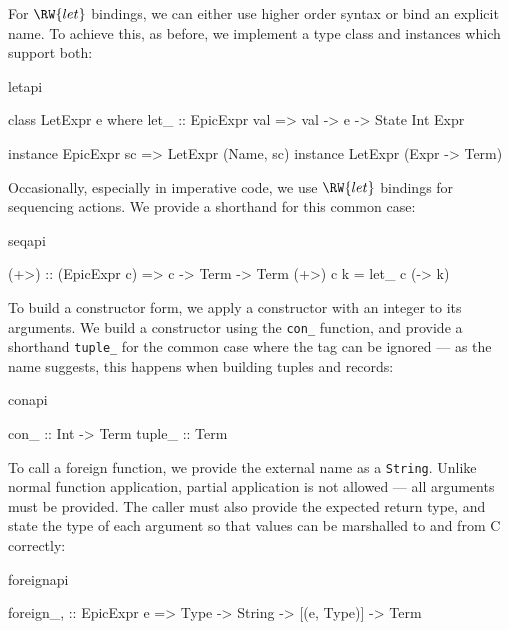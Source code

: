 For $\RW{let}$ bindings, we can either use higher order syntax or bind
an explicit name. To achieve this, as before, we implement a type
class and instances which support both:

\begin{SaveVerbatim}{letapi}

class LetExpr e where
    let_ :: EpicExpr val => val -> e -> State Int Expr

instance EpicExpr sc => LetExpr (Name, sc)
instance                LetExpr (Expr -> Term)

\end{SaveVerbatim}

Occasionally, especially in imperative code, we use $\RW{let}$
bindings for sequencing actions. We provide a shorthand for this
common case:

\begin{SaveVerbatim}{seqapi}

(+>) :: (EpicExpr c) => c -> Term -> Term
(+>) c k = let_ c (\x -> k)

\end{SaveVerbatim}

To build a constructor form, we apply a constructor with an integer
 to its arguments. We build a constructor using the
\texttt{con\_} function, and provide a shorthand \texttt{tuple\_} for
the common case where the tag can be ignored --- as the name suggests,
this happens when building tuples and records:

\begin{SaveVerbatim}{conapi}

con_   :: Int -> Term
tuple_ :: Term

\end{SaveVerbatim}

To call a foreign function, we provide the external name as a
\texttt{String}. Unlike normal function application, partial
application is not allowed --- all arguments must be provided.  The
caller must also provide the expected return type, and state the type
of each argument so that values can be marshalled to and from C
correctly:

\begin{SaveVerbatim}{foreignapi}

foreign_, :: EpicExpr e => 
             Type -> String -> [(e, Type)] -> Term

\end{SaveVerbatim}

